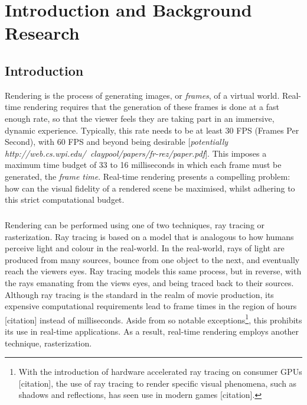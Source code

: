 \chapter{Introduction and Background Research}

\label{chapter1}

\section{Introduction}

Rendering is the process of generating images, or \textit{frames}, of a virtual world. Real-time rendering requires that the generation of these frames is done at a fast enough rate, so that the viewer feels they are taking part in an immersive, dynamic experience. Typically, this rate needs to be at least 30 FPS (Frames Per Second), with 60 FPS and beyond being desirable [\textit{potentially http://web.cs.wpi.edu/~claypool/papers/fr-rez/paper.pdf}]. This imposes a maximum time budget of 33 to 16 milliseconds in which each frame must be generated, the \textit{frame time}. Real-time rendering presents a compelling problem: how can the visual fidelity of a rendered scene be maximised, whilst adhering to this strict computational budget.

\paragraph{}Rendering can be performed using one of two techniques, ray tracing or rasterization. Ray tracing is based on a model that is analogous to how humans perceive light and colour in the real-world. In the real-world, rays of light are produced from many sources, bounce from one object to the next, and eventually reach the viewers eyes. Ray tracing models this same process, but in reverse, with the rays emanating from the views eyes, and being traced back to their sources. Although ray tracing is the standard in the realm of movie production, its expensive computational requirements lead to frame times in the region of hours [citation] instead of milliseconds. Aside from so notable exceptions\footnote{With the introduction of hardware accelerated ray tracing on consumer GPUs [citation], the use of ray tracing to render specific visual phenomena, such as shadows and reflections, has seen use in modern games [citation].}, this prohibits its use in real-time applications. As a result, real-time rendering employs another technique, rasterization.

